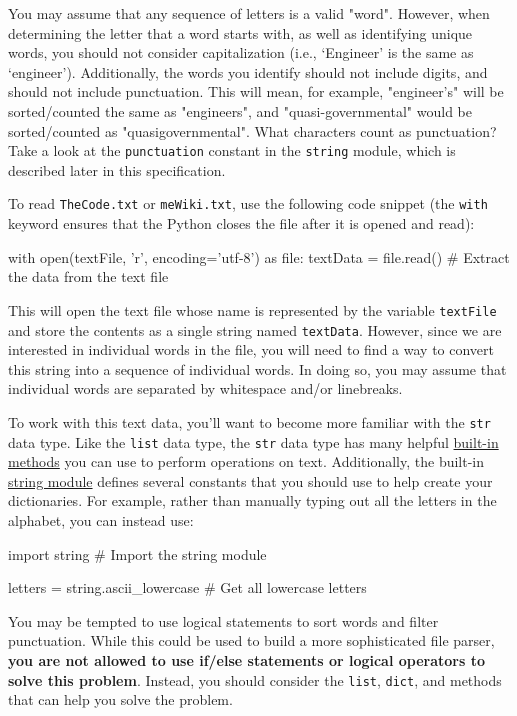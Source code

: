 \documentclass{homework}
\begin{document}
You may assume that any sequence of letters is a valid "word". However, when determining the letter that a word starts with, as well as identifying unique words, you should not consider capitalization (i.e., `Engineer' is the same as `engineer'). Additionally, the words you identify should not include digits, and should not include punctuation. This will mean, for example, "engineer's" will be sorted/counted the same as "engineers", and "quasi-governmental" would be sorted/counted as "quasigovernmental". What characters count as punctuation? Take a look at the \texttt{punctuation} constant in the \texttt{string} module, which is described later in this specification.

To read \texttt{TheCode.txt} or \texttt{meWiki.txt}, use the following code snippet (the \texttt{with} keyword ensures that the Python closes the file after it is opened and read):

\begin{python}
with open(textFile, 'r', encoding='utf-8') as file:
    textData = file.read() # Extract the data from the text file
\end{python}

This will open the text file whose name is represented by the variable \texttt{textFile} and store the contents as a single string named \texttt{textData}. However, since we are interested in individual words in the file, you will need to find a way to convert this string into a sequence of individual words. In doing so, you may assume that individual words are separated by whitespace and/or linebreaks.

To work with this text data, you'll want to become more familiar with the \texttt{str} data type. Like the \texttt{list} data type, the \texttt{str} data type has many helpful \href{https://www.w3schools.com/python/python_ref_string.asp}{built-in methods} you can use to perform operations on text. Additionally, the built-in \href{https://docs.python.org/3/library/string.html#module-string}{string module} defines several constants that you should use to help create your dictionaries. For example, rather than manually typing out all the letters in the alphabet, you can instead use:

\begin{python}
import string # Import the string module

letters = string.ascii_lowercase # Get all lowercase letters
\end{python}

You may be tempted to use logical statements to sort words and filter punctuation. While this could be used to build a more sophisticated file parser, \textbf{you are not allowed to use if/else statements or logical operators to solve this problem}. Instead, you should consider the \texttt{list}, \texttt{dict}, and  methods that can help you solve the problem. %
\end{document}
